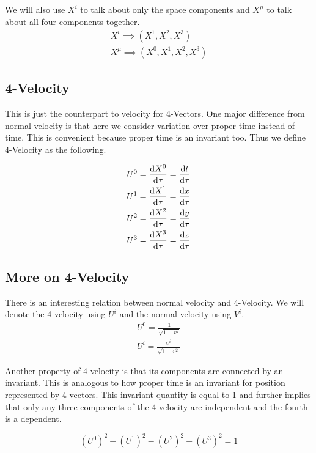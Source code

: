 \documentclass[16pt]{scrartcl}
\numberwithin{equation}{section}
\theoremstyle{plain}
\theoremstyle{definition}
\begin{document}
We will also use $X^i$ to talk about only the space components and $X^\mu$ to talk about all four components together.
\begin{gather}
    X^i \implies (X^1, X^2, X^3)\\
    X^\mu \implies (X^0, X^1, X^2, X^3)
    \label{eq:4-vec-notation}
\end{gather}

\subsection{4-Velocity}

This is just the counterpart to velocity for 4-Vectors. One major difference from normal velocity is that here we consider variation over proper time instead of time. This is convenient because proper time is an invariant too. Thus we define 4-Velocity as the following.

\begin{gather}
    U^0 = \dv{X^0}{\tau} = \dv{t}{\tau}\\
    U^1 = \dv{X^1}{\tau} = \dv{x}{\tau}\\
    U^2 = \dv{X^2}{\tau} = \dv{y}{\tau}\\
    U^3 = \dv{X^3}{\tau} = \dv{z}{\tau}
    \label{eq:4-velocity}
\end{gather}

\subsection{More on 4-Velocity}

There is an interesting relation between normal velocity and 4-Velocity. We will denote the 4-velocity using $U^i$ and the normal velocity using $V^i$.
\begin{gather}
    U^0 = \frac{1}{\sqrt{1 - v^2}}\\
    U^i = \frac{V^i}{\sqrt{1 - v^2}}
    \label{4vel-normalvel}
\end{gather}

Another property of 4-velocity is that its components are connected by an invariant. This is analogous to how proper time is an invariant for position represented by 4-vectors. This invariant quantity is equal to 1 and further implies that only any three components of the 4-velocity are independent and the fourth is a dependent.

\begin{equation}
    (U^0)^2 - (U^1)^2 - (U^2)^2 - (U^3)^2 = 1
    \label{eq:4vel-invariant}
\end{equation}
\end{document}
